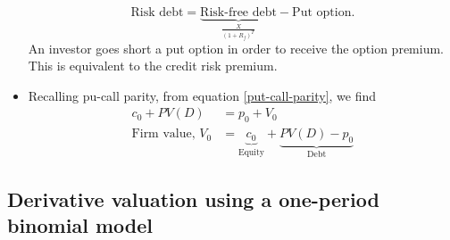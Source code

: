 \documentclass[../notes_compiled.tex]{subfiles}
\begin{document}
\begin{itemize}
\begin{equation}
\text{Risk debt} = \underbrace{\text{Risk-free debt}}_{\frac{X}{(1+R_{f})^{T}}} - \text{Put option}.
\end{equation}
An investor goes short a put option in order to receive the option premium. This is equivalent to the credit risk premium.
\item Recalling pu-call parity, from equation \ref{put-call-parity}, we find
\begin{align}
c_{0} + PV(D) &= p_{0} + V_{0} \\
\text{Firm value, }V_{0} &=\underbrace{c_{0}}_{\text{Equity}} + \underbrace{PV(D)-p_{0}}_{\text{Debt}}
\end{align}
\end{itemize}

\subsection{Derivative valuation using a one-period binomial model}
\end{document}

